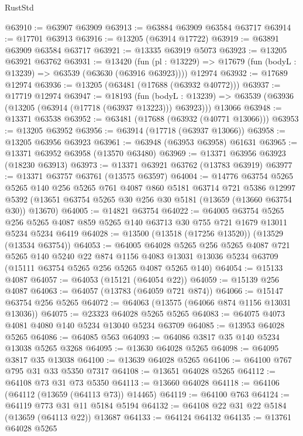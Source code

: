 \begin{lexlean}{RustStd}
\begin{coremodule}
@63910 := @63907 @63909
@63913 := @63884 @63909 @63584 @63717
@63914 := @17701 @63913
@63916 := @13205 (@63914 @17722)
@63919 := @63891 @63909 @63584 @63717
@63921 := @13335 @63919 @5073
@63923 := @13205 @63921 @63762
@63931 := @13420
    (fun (pl : @13229) => @17679 (fun (bodyL : @13239) => @63539 (@63630 (@63916 @63923))))
    @12974
@63932 := @17689 @12974
@63936 := @13205 (@63481 (@17688 (@63932 @40772)))
@63937 := @17719 @12974
@63947 := @18193
    (fun (bodyL : @13239) => @63539 (@63936 (@13205 (@63914 (@17718 (@63937 @13223))) @63923)))
    @13066
@63948 := @13371 @63538
@63952 := @63481 (@17688 (@63932 (@40771 @13066)))
@63953 := @13205 @63952
@63956 := @63914 (@17718 (@63937 @13066))
@63958 := @13205 @63956 @63923
@63961 := @63948 (@63953 @63958) @61631
@63965 := @13371 @63952 @63958 (@13570 @63480)
@63969 := @13371 @63956 @63923 (@18230 @63913)
@63973 := @13371 @63921 @63762 (@13783 @63919)
@63977 := @13371 @63757 @63761 (@13575 @63597)
@64004 := @14776
    @63754
    @5265
    @5265
    @140
    @256
    @5265
    @761
    @4087
    @860
    @5181
    @63714
    @721
    @5386
    @12997
    @5392
    (@13651 @63754 @5265 @30 @256 @30 @5181 (@13659 (@13660 @63754 @30)) @13670)
@64005 := @14821 @63754
@64022 := @64005
    @63754
    @5265
    @256
    @5265
    @4087
    @859
    @5265
    @140
    @63713
    @30
    @755
    @721
    @1679
    @13011
    @5234
    @5234
    @6419
@64028 := @13500 (@13518 (@17256 @13520)) (@13529 (@13534 @63754))
@64053 := @64005
    @64028
    @5265
    @256
    @5265
    @4087
    @721
    @5265
    @140
    @5240
    @22
    @874
    @1156
    @4083
    @13031
    @13036
    @5234
    @63709
    (@15111 @63754 @5265 @256 @5265 @4087 @5265 @140)
@64054 := @15133 @4087
@64057 := @64053 (@15121 (@64054 @22))
@64059 := @15139 @256 @4087
@64063 := @64057 (@13783 (@64059 @721 @874))
@64066 := @15147 @63754 @256 @5265
@64072 := @64063 (@13575 (@64066 @874 @1156 @13031 @13036))
@64075 := @23323 @64028 @5265 @5265
@64083 := @64075 @4073 @4081 @4080 @140 @5234 @13040 @5234 @63709
@64085 := @13953 @64028 @5265
@64086 := @64085 @563
@64093 := @64086 @3817 @35 @140 @5234 @13038 @5265 @3268
@64095 := @13630 @64028 @5265
@64098 := @64095 @3817 @35 @13038
@64100 := @13639 @64028 @5265
@64106 := @64100 @767 @795 @31 @33 @5350 @7317
@64108 := @13651 @64028 @5265
@64112 := @64108 @73 @31 @73 @5350
@64113 := @13660 @64028
@64118 := @64106 (@64112 (@13659 (@64113 @73)) @14465)
@64119 := @64100 @763
@64124 := @64119 @773 @31 @11 @5184 @5194
@64132 := @64108 @22 @31 @22 @5184 (@13659 (@64113 @22)) @13687
@64133 := @64124 @64132
@64135 := @13761 @64028 @5265

\end{coremodule}
\end{lexlean}
